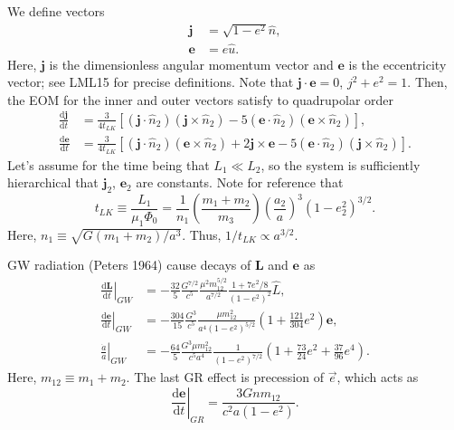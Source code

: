 \documentclass[11pt,
        usenames, %
        dvipsnames %
    ]{article}
\newcommand*{\rd}[2]{\frac{\mathrm{d}#1}{\mathrm{d}#2}}
\newcommand*{\bm}[1]{\boldsymbol{\mathbf{#1}}}
\newcommand*{\at}[1]{\left.#1\right|}
\newcommand*{\p}[1]{\left(#1\right)}
\newcommand*{\s}[1]{\left[#1\right]}
\begin{document}
We define vectors
\begin{align}
    \bm{j} &= \sqrt{1 - e^2}\hat{n},\\
    \bm{e} &= e\hat{u}.
\end{align}
Here, $\bm{j}$ is the dimensionless angular momentum vector and $\bm{e}$ is the
eccentricity vector; see LML15 for precise definitions. Note that $\bm{j} \cdot
\bm{e} = 0$, $j^2 + e^2 = 1$. Then, the EOM for the inner and outer vectors
satisfy to quadrupolar order
\begin{align}
    \rd{\bm{j}}{t} &= \frac{3}{4t_{LK}} \s{
        \p{\bm{j} \cdot \hat{n}_2} \p{\bm{j} \times \hat{n}_2}
        - 5\p{\bm{e} \cdot \hat{n}_2}\p{\bm{e} \times \hat{n}_2}
        },\\
    \rd{\bm{e}}{t} &= \frac{3}{4t_{LK}} \s{
        \p{\bm{j} \cdot \hat{n}_2} \p{\bm{e} \times \hat{n}_2}
        + 2\bm{j} \times \bm{e}
        - 5\p{\bm{e} \cdot \hat{n}_2}\p{\bm{j} \times \hat{n}_2}
        }.
\end{align}
Let's assume for the time being that $L_1 \ll L_2$, so the system is
sufficiently hierarchical that $\bm{j}_2$, $\bm{e}_2$ are constants. Note for
reference that
\begin{equation}
    t_{LK} \equiv \frac{L_1}{\mu_1 \Phi_0}
        = \frac{1}{n_1}\p{\frac{m_1 + m_2}{m_3}}
            \p{\frac{a_2}{a}}^3
            \p{1 - e_2^2}^{3/2}.
\end{equation}
Here, $n_1 \equiv \sqrt{G\p{m_1 + m_2}/a^3}$. Thus, $1 / t_{LK} \propto
a^{3/2}$.

GW radiation (Peters 1964) cause decays of $\bm{L}$ and $\bm{e}$ as
\begin{align}
    \at{\rd{\bm{L}}{t}}_{GW} &= -\frac{32}{5}\frac{G^{7/2}}{c^5}
        \frac{\mu^2 m_{12}^{5/2}}{a^{7/2}}
        \frac{1 + 7e^2/8}{\p{1 - e^2}^2}\hat{L},\\
    \at{\rd{\bm{e}}{t}}_{GW} &= -\frac{304}{15} \frac{G^3}{c^5}
        \frac{\mu m_{12}^2}{a^4\p{1 - e^2}^{5/2}}\p{1 + \frac{121}{304}
            e^2}\bm{e},\\
    \at{\frac{\dot{a}}{a}}_{GW} &= -\frac{64}{5} \frac{G^3 \mu m_{12}^2}{c^5a^4}
        \frac{1}{\p{1 - e^2}^{7/2}}\p{1 + \frac{73}{24}e^2
            + \frac{37}{96}e^4}.
\end{align}
Here, $m_{12} \equiv m_1 + m_2$. The last GR effect is precession of $\vec{e}$,
which acts as
\begin{equation}
    \at{\rd{\bm{e}}{t}}_{GR} = \frac{3Gnm_{12}}{c^2a\p{1 - e^2}}.
\end{equation}
\end{document}
